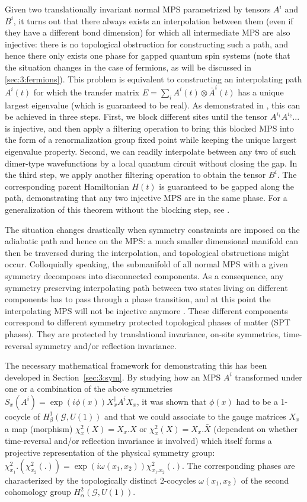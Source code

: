 \documentclass[rmp,aps,reprint,superscriptaddress,nobalancelastpage]{revtex4-1}
\begin{document}
Given two translationally invariant normal MPS parametrized by tensors $A^i$ and $B^i$, it turns out that there always exists an interpolation between them (even if they have a different bond dimension) for which all intermediate MPS are also injective: there is no topological obstruction for constructing such a path, and hence there only exists one phase for gapped quantum spin systems \cite{chen:1d-phases-rg,schuch:mps-phases} (note that the situation changes in the case of fermions, as will be discussed in \ref{sec:3:fermions}). This problem is equivalent to constructing an interpolating path $A^i(t)$ for which the transfer matrix $E=\sum_i A^i(t)\otimes \bar{A}^i(t)$ has a unique largest eigenvalue (which is guaranteed to be real). As demonstrated in \citet{schuch:mps-phases}, this can be achieved in three steps.  First, we block different sites until the tensor $A^{i_1}A^{i_2}...$ is injective, and then apply a filtering operation to bring this blocked MPS into the form of a renormalization group fixed point while keeping the unique largest eigenvalue property. Second, we can readily interpolate between any two of such dimer-type wavefunctions by a local quantum circuit without closing the gap. In the third step, we apply another filtering operation to obtain the tensor $B^i$. The corresponding parent Hamiltonian $H(t)$ is guaranteed to be gapped along the path, demonstrating that any two injective MPS are in the same phase. For a generalization of this theorem without the blocking step, see \cite{szehr2016connected}.

The situation changes drastically when symmetry constraints are imposed on the adiabatic path and hence on the MPS: a much smaller dimensional manifold can then be traversed during the interpolation, and topological obstructions might occur. Colloquially speaking, the submanifold of all normal MPS with a given symmetry decomposes into disconnected components. As a consequence, any symmetry preserving interpolating path between two states living on different components has to pass through a phase transition, and at this point the interpolating MPS will not be injective anymore \cite{chen:1d-phases-rg,schuch:mps-phases}. These different components correspond to different symmetry protected topological phases of matter (SPT phases). They are protected by translational invariance, on-site symmetries, time-reversal symmetry and/or reflection invariance.


The necessary mathematical framework for demonstrating this has been developed in Section~\ref{sec:3:sym}. By studying how an MPS $A^i$ transformed under one or a combination of the above symmetries $S_x(A^i)=\exp(i\phi(x))X_x^\dagger A^i X_x$, it was shown that $\phi(x)$ had to be a 1-cocycle of $H^1_\beta(\mathcal{G},U(1))$ and that we could associate to the gauge matrices $X_x$ a map (morphism) $\chi^2_x(X)=X_x.X$ or $\chi^2_x(X)=X_x.\bar{X}$ (dependent on whether time-reversal and/or reflection invariance is involved)  which itself forms a projective representation of the physical symmetry group: $\chi^2_{x_1}.\left(\chi^2_{x_2}(.)\right)=\exp(i\omega(x_1,x_2))\chi^2_{x_1.x_2}(.)$. The corresponding phases are characterized by the topologically distinct 2-cocycles $\omega(x_1,x_2)$ of the second cohomology group $H^2_\alpha(\mathcal{G},U(1))$.
\end{document}
